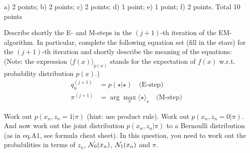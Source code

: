 \documentclass[a4paper]{article}
\newcommand{\tjboxed}[1]{}
\begin{document}
\begin{exam}
\begin{vraag}{a) 2 points; b) 2 points; c) 2 points; d) 1 point; e) 1 point; f) 2 points. Total 10 points}
\begin{deelvraag}
Describe shortly the E- and M-steps in the $(j+1)$-th iteration of the EM-algorithm. In particular, complete the following equation set (fill in the stars) for the $(j+1)$-th iteration and shortly describe the meaning of the equations: (Note: the expression $\langle f(x)\rangle_{p(x)}$ stands for the expectation of $f(x)$ w.r.t. probability distribution $p(x)$.)
\begin{align*}
q_n^{(j+1)} &= p(\star|\star) \quad\text{(E-step)}\\
\pi^{(j+1)} &= \arg\max_\pi \langle\star\rangle_{\star} \quad \text{(M-step)}
\end{align*}
\tjboxed{
\begin{align*}
q_n^{(j+1)} &= p(z_n|x_n,\pi^{(j)}) \quad\text{(E-step)}\\
\pi^{(j+1)} &= \arg\max_\pi \langle \sum_n p(x_n,z_n|\pi)\rangle_{q_n^{(j+1)}} \quad \text{(M-step)}
\end{align*}
\textbf{E-step}: $q_n^{(t+1)}$ is the posterior probability of $z_n$, given observation $x_n$ and an estimate $\pi^{(j)}$ from the previous iteration. $q_n$ represents our knowledge about $z_n$. \\
\textbf{M-step}: Maximizes the expected complete-data log-likelihood. Through Jensen's inequality it can be proved that this procedure increases the (observed data) log-likelihood $p(D|\pi)$.
}%
\end{deelvraag}

%

\begin{deelvraag}
Work out $p(x_n,z_n=1|\pi)$ (hint: use product rule).  Work out $p(x_n,z_n=0|\pi)$. And now work out the joint distribution $p(x_n,z_n|\pi)$ to a Bernoulli distribution (as in eq.A1, see formula cheat sheet). In this question, you need to work out the probabilities in terms of $z_n$, $\mathcal{N}_0(x_n)$, $\mathcal{N}_1(x_n)$ and $\pi$.
\tjboxed{
$p(x_n,z_n=1) = p(x_n|z_n=1)p(z_n=1)=\pi\N_1(x_n)$\\
$p(x_n,z_n=0) = p(x_n|z_n=0)p(z_n=0)=(1-\pi)\N_0(x_n)$\\
$p(x_n,z_n|\pi) = [\pi\N_1(x_n)]^{z_n}[(1-\pi)\N_0(x_n)]^{1-z_n}$
}%
\end{deelvraag}


\end{vraag}
\end{exam}
\end{document}
